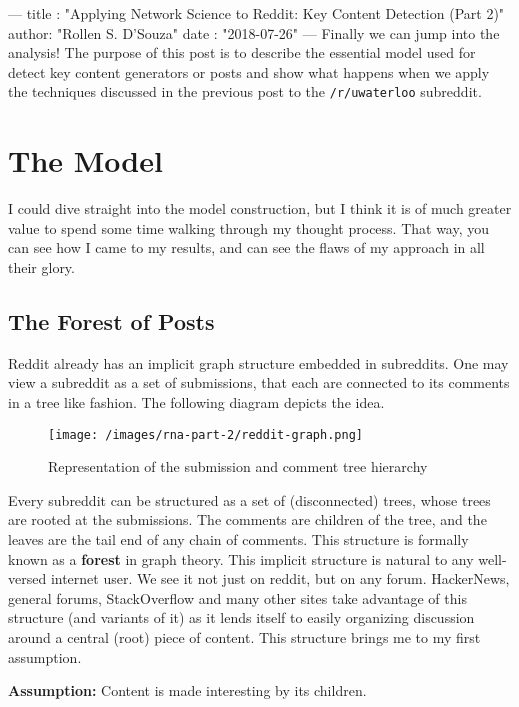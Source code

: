 ---
title :   "Applying Network Science to Reddit: Key Content Detection (Part 2)"
author:   "Rollen S. D'Souza"
date  :   "2018-07-26"
---
Finally we can jump into the analysis!
The purpose of this post is to describe the essential model used for detect key content generators or posts and show what happens when we apply the techniques discussed in the previous post to the \texttt{/r/uwaterloo} subreddit.

\section{The Model}
I could dive straight into the model construction, but I think it is of much greater value to spend some time walking through my thought process.
That way, you can see how I came to my results, and can see the flaws of my approach in all their glory.

\subsection{The Forest of Posts}
Reddit already has an implicit graph structure embedded in subreddits. One may view a subreddit as a set of submissions, that each are connected to its comments in a tree like fashion. The following diagram depicts the idea.
%
\begin{figure}
    \texttt{[image: /images/rna-part-2/reddit-graph.png]}
    \caption{Representation of the submission and comment tree hierarchy}
\end{figure}
%
Every subreddit can be structured as a set of (disconnected) trees, whose trees are rooted at the submissions.
The comments are children of the tree, and the leaves are the tail end of any chain of comments.
This structure is formally known as a \textbf{forest} in graph theory.
This implicit structure is natural to any well-versed internet user.
We see it not just on reddit, but on any forum.
HackerNews, general forums, StackOverflow and many other sites take advantage of this structure (and variants of it) as it lends itself to easily organizing discussion around a central (root) piece of content.
This structure brings me to my first assumption.

\textbf{Assumption:} Content is made interesting by its children.

